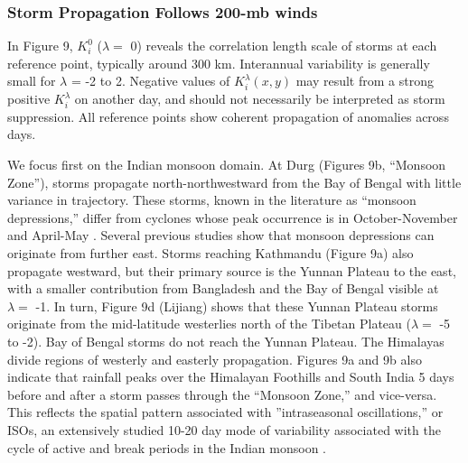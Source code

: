 \documentclass[12pt]{article}
\begin{document}
\subsubsection{Storm Propagation Follows 200-mb winds}	
		 	 		
	 In Figure 9, $K_i^0$ ($\lambda =$ 0) reveals the correlation length scale of storms at each reference point, typically around 300 km. Interannual variability is generally small for $\lambda$ = -2 to 2. Negative values of $K_i^\lambda(x,y)$ may result from a strong positive $K_i^{\lambda}$  on another day, and should not necessarily be interpreted as storm suppression. All reference points show coherent propagation of anomalies across days. 
	 
	 We focus first on the Indian monsoon domain. At Durg (Figures 9b, ``Monsoon Zone''), storms propagate north-northwestward from the Bay of Bengal with little variance in trajectory. These storms, known in the literature as ``monsoon depressions,'' differ from cyclones whose peak occurrence is in October-November and April-May \citep{Li2013}. Several previous studies show that monsoon depressions can originate from further east\citep{Saha1981,Fujinami2011}. Storms reaching Kathmandu (Figure 9a) also propagate westward, but their primary source is the Yunnan Plateau to the east, with a smaller contribution from Bangladesh and the Bay of Bengal visible at $\lambda =$ -1. In turn, Figure 9d (Lijiang) shows that these Yunnan Plateau storms originate from the mid-latitude westerlies north of the Tibetan Plateau ($\lambda =$ -5 to -2). Bay of Bengal storms do not reach the Yunnan Plateau. The Himalayas divide regions of westerly and easterly propagation. Figures 9a and 9b also indicate that rainfall peaks over the Himalayan Foothills and South India 5 days before and after a storm passes through the ``Monsoon Zone,'' and vice-versa. This reflects the spatial pattern associated with ''intraseasonal oscillations,'' or ISOs, an extensively studied 10-20 day mode of variability associated with the cycle of active and break periods in the Indian monsoon \citep{Krishnamurti1980,Chen1993,Annamalai2001,Han2006,Fujinami2014}.
	 	 
\end{document}
